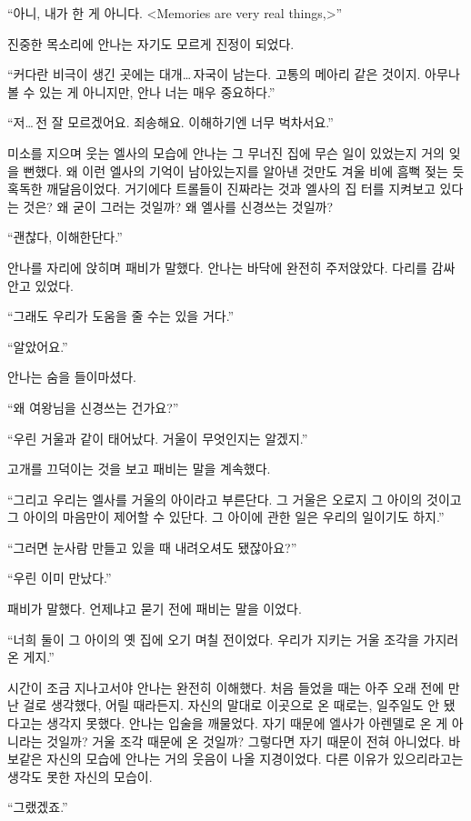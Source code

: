 ``아니, 내가 한 게 아니다. <Memories are very real things,>''

진중한 목소리에 안나는 자기도 모르게 진정이 되었다.

``커다란 비극이 생긴 곳에는 대개\ldots\,자국이 남는다. 고통의 메아리 같은 것이지. 아무나 볼 수 있는 게 아니지만, 안나 너는 매우 중요하다.''

``저\ldots\,전 잘 모르겠어요. 죄송해요. 이해하기엔 너무 벅차서요.''

미소를 지으며 웃는 엘사의 모습에 안나는 그 무너진 집에 무슨 일이 있었는지 거의 잊을 뻔했다. 왜 이런 엘사의 기억이 남아있는지를 알아낸 것만도 겨울 비에 흠뻑 젖는 듯 혹독한 깨달음이었다. 거기에다 트롤들이 진짜라는 것과 엘사의 집 터를 지켜보고 있다는 것은? 왜 굳이 그러는 것일까? 왜 엘사를 신경쓰는 것일까?

``괜찮다, 이해한단다.''

안나를 자리에 앉히며 패비가 말했다. 안나는 바닥에 완전히 주저앉았다. 다리를 감싸 안고 있었다.

``그래도 우리가 도움을 줄 수는 있을 거다.''

``알았어요.''

안나는 숨을 들이마셨다.

``왜 여왕님을 신경쓰는 건가요?''

``우린 거울과 같이 태어났다. 거울이 무엇인지는 알겠지.''

고개를 끄덕이는 것을 보고 패비는 말을 계속했다.

``그리고 우리는 엘사를 거울의 아이라고 부른단다. 그 거울은 오로지 그 아이의 것이고 그 아이의 마음만이 제어할 수 있단다. 그 아이에 관한 일은 우리의 일이기도 하지.''

``그러면 눈사람 만들고 있을 때 내려오셔도 됐잖아요?''

``우린 이미 만났다.''

패비가 말했다. 언제냐고 묻기 전에 패비는 말을 이었다.

``너희 둘이 그 아이의 옛 집에 오기 며칠 전이었다. 우리가 지키는 거울 조각을 가지러 온 게지.''

시간이 조금 지나고서야 안나는 완전히 이해했다. 처음 들었을 때는 아주 오래 전에 만난 걸로 생각했다, 어릴 때라든지. 자신의 말대로 이곳으로 온 때로는, 일주일도 안 됐다고는 생각지 못했다. 안나는 입술을 깨물었다. 자기 때문에 엘사가 아렌델로 온 게 아니라는 것일까? 거울 조각 때문에 온 것일까? 그렇다면 자기 때문이 전혀 아니었다. 바보같은 자신의 모습에 안나는 거의 웃음이 나올 지경이었다. 다른 이유가 있으리라고는 생각도 못한 자신의 모습이.

``그랬겠죠.''

